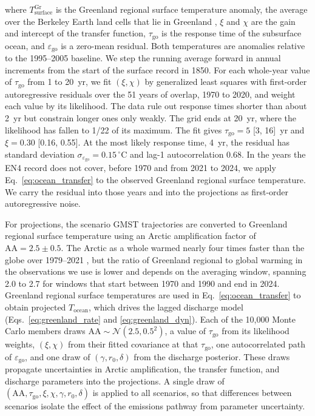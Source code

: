 \documentclass[draft,linenumbers]{agujournal2025}
\begin{document}
where $T_{\mathrm{surface}}^{\mathrm{Gr}}$ is the Greenland regional surface temperature anomaly, the average over the Berkeley Earth land cells that lie in Greenland \citep{Rohde2020}, $\xi$ and $\chi$ are the gain and intercept of the transfer function, $\tau_{\mathrm{go}}$ is the response time of the subsurface ocean, and $\varepsilon_{\mathrm{go}}$ is a zero-mean residual. Both temperatures are anomalies relative to the 1995--2005 baseline. We step the running average forward in annual increments from the start of the surface record in 1850. For each whole-year value of $\tau_{\mathrm{go}}$ from 1 to 20~yr, we fit $(\xi, \chi)$ by generalized least squares with first-order autoregressive residuals over the 51 years of overlap, 1970 to 2020, and weight each value by its likelihood. The data rule out response times shorter than about 2~yr but constrain longer ones only weakly. The grid ends at 20~yr, where the likelihood has fallen to 1/22 of its maximum. The fit gives $\tau_{\mathrm{go}} = 5$ [3, 16]~yr and $\xi = 0.30$ [0.16, 0.55]. At the most likely response time, 4~yr, the residual has standard deviation $\sigma_{\varepsilon_{\mathrm{go}}} = 0.15$\,$^\circ$C and lag-1 autocorrelation 0.68. In the years the EN4 record does not cover, before 1970 and from 2021 to 2024, we apply Eq.~\ref{eq:ocean_transfer} to the observed Greenland regional surface temperature. We carry the residual into those years and into the projections as first-order autoregressive noise. 

For projections, the scenario GMST trajectories are converted to Greenland regional surface temperature using an Arctic amplification factor of $\mathrm{AA} = 2.5 \pm 0.5$. The Arctic as a whole warmed nearly four times faster than the globe over 1979--2021 \citep{Rantanen2022}, but the ratio of Greenland regional to global warming in the observations we use is lower and depends on the averaging window, spanning 2.0 to 2.7 for windows that start between 1970 and 1990 and end in 2024. Greenland regional surface temperatures are used in Eq.~\ref{eq:ocean_transfer} to obtain projected $T_{\mathrm{ocean}}$, which drives the lagged discharge model (Eqs.~\ref{eq:greenland_rate} and \ref{eq:greenland_dyn}). Each of the 10,000 Monte Carlo members draws $\mathrm{AA} \sim \mathcal{N}(2.5, 0.5^2)$, a value of $\tau_{\mathrm{go}}$ from its likelihood weights, $(\xi, \chi)$ from their fitted covariance at that $\tau_{\mathrm{go}}$, one autocorrelated path of $\varepsilon_{\mathrm{go}}$, and one draw of $(\gamma, r_0, \delta)$ from the discharge posterior. These draws propagate uncertainties in Arctic amplification, the transfer function, and discharge parameters into the projections. A single draw of $(\mathrm{AA}, \tau_{\mathrm{go}}, \xi, \chi, \gamma, r_0, \delta)$ is applied to all scenarios, so that differences between scenarios isolate the effect of the emissions pathway from parameter uncertainty.
\end{document}
